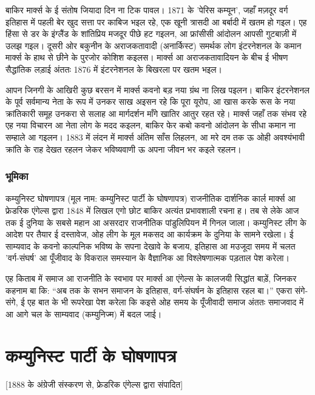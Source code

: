 \documentclass[12pt,a4paper,oneside]{book}
\begin{document}
बाकिर मार्क्स के ई संतोष जियादा दिन ना टिक पावल। 1871 के 'पेरिस कम्यून', जहाँ मज़दूर वर्ग इतिहास में पहली बेर खुद सत्ता पर काबिज भइल रहे, एक खूनी त्रासदी आ बर्बादी में खतम हो गइल। एह हिंसा से डर के इंग्लैंड के शांतिप्रिय मजदूर पीछे हट गइलन, आ फ्रांसीसी आंदोलन आपसी गुटबाज़ी में उलझ गइल। दूसरी ओर बकुनीन के अराजकतावादी (अनार्किस्ट) समर्थक लोग इंटरनेशनल के कमान मार्क्स के हाथ से छीने के पुरजोर कोशिश कइलस। मार्क्स आ अराजकतावादियन के बीच ई भीषण सैद्धांतिक लड़ाई अंततः 1876 में इंटरनेशनल के बिखरला पर खतम भइल।

आपन जिनगी के आखिरी कुछ बरसन में मार्क्स कवनो बड़ नया ग्रंथ ना लिख पइलन। बाकिर इंटरनेशनल के पूर्व सर्वमान्य नेता के रूप में उनकर साख अइसन रहे कि पूरा यूरोप, आ खास करके रूस के नया क्रांतिकारी समूह उनकरा से सलाह आ मार्गदर्शन माँगे खातिर आतुर रहत रहे। मार्क्स जहाँ तक संभव रहे एह नया विचारन आ नेता लोग के मदद कइलन, बाकिर फेर कबो कवनो आंदोलन के सीधा कमान ना सम्हाले आ गइलन। 1883 में लंदन में मार्क्स अंतिम साँस लिहलन, आ मरे दम तक ऊ ओही अवश्यंभावी क्रांति के राह देखत रहलन जेकर भविष्यवाणी ऊ अपना जीवन भर कइले रहलन।


\subsection*{भूमिका}
कम्युनिस्ट घोषणापत्र (मूल नाम: कम्युनिस्ट पार्टी के घोषणापत्र) राजनीतिक दार्शनिक कार्ल मार्क्स आ फ्रेडरिक एंगेल्स द्वारा 1848 में लिखल एगो छोट बाकिर अत्यंत प्रभावशाली रचना ह। तब से लेके आज तक ई दुनिया के सबसे महान आ असरदार राजनीतिक पांडुलिपियन में गिनल जाला। कम्युनिस्ट लीग के आदेश पर तैयार ई दस्तावेज, ओह लीग के मूल मकसद आ कार्यक्रम के दुनिया के सामने रखेला। ई साम्यवाद के कवनो काल्पनिक भविष्य के सपना देखावे के बजाय, इतिहास आ मउजूदा समय में चलत 'वर्ग-संघर्ष' आ पूँजीवाद के विकराल समस्यान के वैज्ञानिक आ विश्लेषणात्मक पड़ताल पेश करेला।

एह किताब में समाज आ राजनीति के स्वभाव पर मार्क्स आ एंगेल्स के कालजयी सिद्धांत बाड़ें, जिनकर कहनाम बा कि: “अब तक के सभन समाजन के इतिहास, वर्ग-संघर्षन के इतिहास रहल बा।” एकरा संगे-संगे, ई एह बात के भी रूपरेखा पेश करेला कि कइसे ओह समय के पूँजीवादी समाज अंततः समाजवाद में आ आगे चल के साम्यवाद (कम्युनिज्म) में बदल जाई।

\cleardoublepage
\chapter*{कम्युनिस्ट पार्टी के घोषणापत्र}
[1888 के अंग्रेजी संस्करण से, फ्रेडरिक एंगेल्स द्वारा संपादित]
\end{document}
